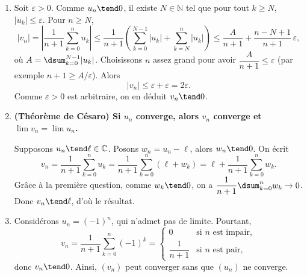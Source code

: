 \begin{enumerate}

\item

Soit $\varepsilon>0$. Comme $u_n\tend 0$, il existe $N\in\mathbb{N}$ tel que pour tout $k\ge N$, $|u_k|\le \varepsilon$.
Pour $n\ge N$,
\[
  |v_n|
  = \left|\frac{1}{n+1}\sum_{k=0}^n u_k\right|
  \le \frac{1}{n+1}\left(\sum_{k=0}^{N-1}|u_k| + \sum_{k=N}^n |u_k|\right)
  \le \frac{A}{n+1} + \frac{n-N+1}{n+1}\,\varepsilon,
\]
où $A=\dsum_{k=0}^{N-1}|u_k|$. Choisissons $n$ assez grand pour avoir $\dfrac{A}{n+1}\le \varepsilon$ (par exemple $n+1\ge A/\varepsilon$). Alors
\[
  |v_n| \le \varepsilon + \varepsilon = 2\varepsilon.
\]
Comme $\varepsilon>0$ est arbitraire, on en déduit $v_n\tend 0$.

\item \textbf{(Théorème de Césaro) Si $u_n$ converge, alors $v_n$ converge et $\displaystyle \lim v_n=\lim u_n$.}

Supposons $u_n\tend \ell\in\mathbb{C}$. Posons $w_n= u_n-\ell$, alors $w_n\tend 0$.
On écrit
\[
  v_n
  = \frac{1}{n+1}\sum_{k=0}^n u_k
  = \frac{1}{n+1}\sum_{k=0}^n (\ell + w_k)
  = \ell + \frac{1}{n+1}\sum_{k=0}^n w_k.
\]
Grâce à la première question, comme $w_k\tend 0$, on a $\dfrac{1}{n+1}\dsum_{k=0}^n w_k \to 0$. Donc $v_n\tend \ell$, d'où le résultat.

\item
Considérons $u_n = (-1)^n$, qui n'admet pas de limite. Pourtant,
\[
  v_n = \frac{1}{n+1}\sum_{k=0}^n (-1)^k =
  \begin{cases}
    0 & \text{si $n$ est impair},\\[0.2em]
    \dfrac{1}{n+1} & \text{si $n$ est pair},
  \end{cases}
\]
donc $v_n\tend 0$. Ainsi, $(v_n)$ peut converger sans que $(u_n)$ ne converge.
\end{enumerate}
